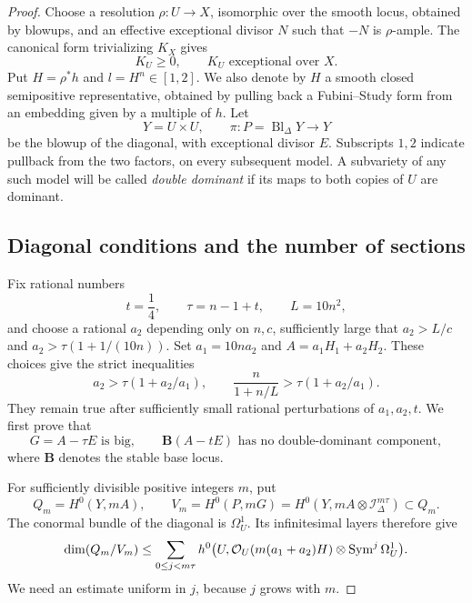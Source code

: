 \begin{proof}
Choose a resolution $\rho:U\to X$, isomorphic over the smooth locus,
obtained by blowups, and an effective exceptional divisor $N$ such that
$-N$ is $\rho$-ample.  The canonical form trivializing $K_X$ gives
\[
 K_U\ge0,\qquad K_U\text{ exceptional over }X.
\]
Put $H=\rho^*h$ and $l=H^n\in[1,2]$.  We also denote by $H$ a smooth
closed semipositive representative, obtained by pulling back a
Fubini--Study form from an embedding given by a multiple of $h$.
Let
\[
 Y=U\times U,\qquad
 \pi:P=\operatorname{Bl}_{\Delta}Y\longrightarrow Y
\]
be the blowup of the diagonal, with exceptional divisor $E$.  Subscripts
$1,2$ indicate pullback from the two factors, on every subsequent model.
A subvariety of any such model will be called \emph{double dominant} if
its maps to both copies of $U$ are dominant.

\subsection*{Diagonal conditions and the number of sections}

Fix rational numbers
\[
 t=\frac14,\qquad \tau=n-1+t,\qquad L=10n^2,
\]
and choose a rational $a_2$ depending only on $n,c$, sufficiently large
that $a_2>L/c$ and $a_2>\tau(1+1/(10n))$.  Set $a_1=10na_2$ and
$A=a_1H_1+a_2H_2$.  These choices give the strict inequalities
\begin{equation}\label{diag:parameter-margins}
 a_2>\tau(1+a_2/a_1),
 \qquad
 \frac{n}{1+n/L}>\tau(1+a_2/a_1).
\end{equation}
They remain true after sufficiently small rational perturbations of
$a_1,a_2,t$.  We first prove that
\begin{equation}\label{diag:base-locus-goal}
 G=A-\tau E\text{ is big},
 \qquad
 \mathbf B(A-tE)\text{ has no double-dominant component},
\end{equation}
where $\mathbf B$ denotes the stable base locus.

For sufficiently divisible positive integers $m$, put
\[
 Q_m=H^0(Y,mA),\qquad
 V_m=H^0(P,mG)
     =H^0(Y,mA\otimes\mathcal I_\Delta^{m\tau})\subset Q_m.
\]
The conormal bundle of the diagonal is $\Omega_U^1$.  Its infinitesimal
layers therefore give
\begin{equation}\label{diag:layers}
 \dim(Q_m/V_m)
 \le\sum_{0\le j<m\tau}
 h^0\bigl(U,\mathcal O_U(m(a_1+a_2)H)\otimes\operatorname{Sym}^j\Omega_U^1\bigr).
\end{equation}
We need an estimate uniform in $j$, because $j$ grows with $m$.


\end{proof}
